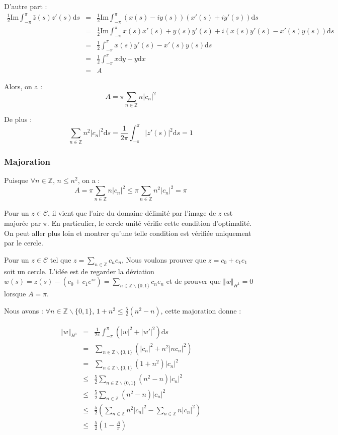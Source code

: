\documentclass[10pt,a4paper]{article}
\newcommand{\Z}{\mathbb{Z}}
\renewcommand{\d}{\mathrm{d}}
\renewcommand{\Im}{\mathrm{Im}}
\theoremstyle{plain}
\theoremstyle{definition}
\begin{document}
D'autre part :
\begin{eqnarray*}
\frac{1}{2} \Im \int_{-\pi}^{\pi}{\bar{z}(s) z'(s) \d s} &=& \frac{1}{2} \Im \int_{-\pi}^{\pi}{(x(s)-iy(s)) (x'(s)+iy'(s)) \d s} \\
&=& \frac{1}{2} \Im \int_{-\pi}^{\pi}{x(s)x'(s)+y(s)y'(s) + i(x(s)y'(s)-x'(s)y(s)) \d s} \\
&=& \frac{1}{2} \int_{-\pi}^{\pi}{x(s)y'(s)-x'(s)y(s) \d s} \\
&=& \frac{1}{2} \int_{-\pi}^{\pi}{x\d y-y\d x} \\
&=& A
\end{eqnarray*}

Alors, on a :
\[ A =  \pi \sum_{n\in \Z}{ n |c_n|^2} \]

De plus :
\[ \sum_{n\in \Z}{n^2|c_n|^2} \d s = \frac{1}{2\pi} \int_{-\pi}^{\pi}{|z'(s)|^2\d s} = 1 \]

\subsubsection{Majoration}

Puisque $\forall n \in \Z$, $n \leqslant n^2$, on a :
\[ A = \pi \sum_{n\in \Z}{n|c_n|^2} \leqslant \pi \sum_{n\in \Z}{n^2|c_n|^2} = \pi  \]

Pour un $z \in \mathcal{C}$, il vient que l'aire du domaine délimité par l'image de $z$ est majorée par $\pi$. En particulier, le cercle unité vérifie cette condition d'optimalité. On peut aller plus loin et montrer qu'une telle condition est vérifiée uniquement par le cercle.


Pour un $z \in \mathcal{C}$ tel que $z=\sum_{n\in \Z}{c_ne_n}$, Nous voulons prouver que $z = c_0 + c_1 e_1$ soit un cercle. L'idée est de regarder la déviation $w(s) = z(s) - (c_0+c_1e^{is}) = \sum_{n\in \Z\backslash \{0,1\}}{c_ne_n}$ et de prouver que $\Vert w\Vert_{H^1} = 0$ lorsque $A=\pi$.

Nous avons : $\forall n \in \Z \backslash \{0,1\}$, $1+n^2 \leqslant \frac{5}{2} (n^2-n)$, cette majoration donne :

\begin{eqnarray*}
\Vert w\Vert_{H^1} &=& \frac{1}{2\pi} \int_{-\pi}^{\pi}{ (|w|^2+|w'|^2)\d s} \\
&=& \sum_{n\in \Z\backslash \{0,1\}}{(|c_n|^2+ n^2|nc_n|^2)} \\
&=& \sum_{n\in \Z\backslash \{0,1\}}{(1+n^2) |c_n|^2 } \\
&\leqslant& \frac{5}{2} \sum_{n\in \Z\backslash \{0,1\}}{(n^2-n) |c_n|^2 } \\
&\leqslant& \frac{5}{2} \sum_{n\in \Z}{(n^2-n) |c_n|^2 } \\
&\leqslant& \frac{5}{2} \left(\sum_{n\in \Z}{n^2|c_n|^2} - \sum_{n\in \Z}{n|c_n|^2 } \right) \\
&\leqslant& \frac{5}{2} \left(1 - \frac{A}{\pi}\right)
\end{eqnarray*}
\end{document}
